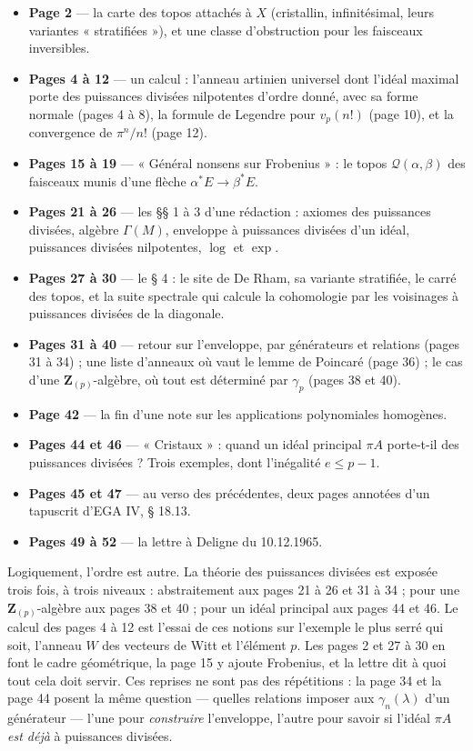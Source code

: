 \documentclass[11pt,a4paper]{article}
\begin{document}
\begin{itemize}
\item \textbf{Page 2} — la carte des topos attachés à $X$ (cristallin,
infinitésimal, leurs variantes « stratifiées »), et une classe d'obstruction
pour les faisceaux inversibles.
\item \textbf{Pages 4 à 12} — un calcul : l'anneau artinien universel dont
l'idéal maximal porte des puissances divisées nilpotentes d'ordre donné,
avec sa forme normale (pages 4 à 8), la formule de Legendre pour $v_p(n!)$
(page 10), et la convergence de $\pi^{n}/n!$ (page 12).
\item \textbf{Pages 15 à 19} — « Général nonsens sur Frobenius » : le topos
$\mathcal{Q}(\alpha, \beta)$ des faisceaux munis d'une flèche
$\alpha^{*}E \to \beta^{*}E$.
\item \textbf{Pages 21 à 26} — les §§ 1 à 3 d'une rédaction : axiomes des
puissances divisées, algèbre $\Gamma(M)$, enveloppe à puissances divisées
d'un idéal, puissances divisées nilpotentes, $\log$ et $\exp$.
\item \textbf{Pages 27 à 30} — le § 4 : le site de De Rham, sa variante
stratifiée, le carré des topos, et la suite spectrale qui calcule la
cohomologie par les voisinages à puissances divisées de la diagonale.
\item \textbf{Pages 31 à 40} — retour sur l'enveloppe, par générateurs et
relations (pages 31 à 34) ; une liste d'anneaux où vaut le lemme de Poincaré
(page 36) ; le cas d'une $\mathbf{Z}_{(p)}$-algèbre, où tout est déterminé
par $\gamma_p$ (pages 38 et 40).
\item \textbf{Page 42} — la fin d'une note sur les applications polynomiales
homogènes.
\item \textbf{Pages 44 et 46} — « Cristaux » : quand un idéal principal
$\pi A$ porte-t-il des puissances divisées ? Trois exemples, dont
l'inégalité $e \leqslant p - 1$.
\item \textbf{Pages 45 et 47} — au verso des précédentes, deux pages
annotées d'un tapuscrit d'EGA IV, § 18.13.
\item \textbf{Pages 49 à 52} — la lettre à Deligne du 10.12.1965.
\end{itemize}

Logiquement, l'ordre est autre. La théorie des puissances divisées est
exposée trois fois, à trois niveaux : abstraitement aux pages 21 à 26 et 31
à 34 ; pour une $\mathbf{Z}_{(p)}$-algèbre aux pages 38 et 40 ; pour un
idéal principal aux pages 44 et 46. Le calcul des pages 4 à 12 est l'essai
de ces notions sur l'exemple le plus serré qui soit, l'anneau $W$ des
vecteurs de Witt et l'élément $p$. Les pages 2 et 27 à 30 en font le cadre
géométrique, la page 15 y ajoute Frobenius, et la lettre dit à quoi tout
cela doit servir. Ces reprises ne sont pas des répétitions : la page 34 et
la page 44 posent la même question — quelles relations imposer aux
$\gamma_n(\lambda)$ d'un générateur — l'une pour \emph{construire}
l'enveloppe, l'autre pour savoir si l'idéal $\pi A$ \emph{est déjà} à
puissances divisées.
\end{document}
